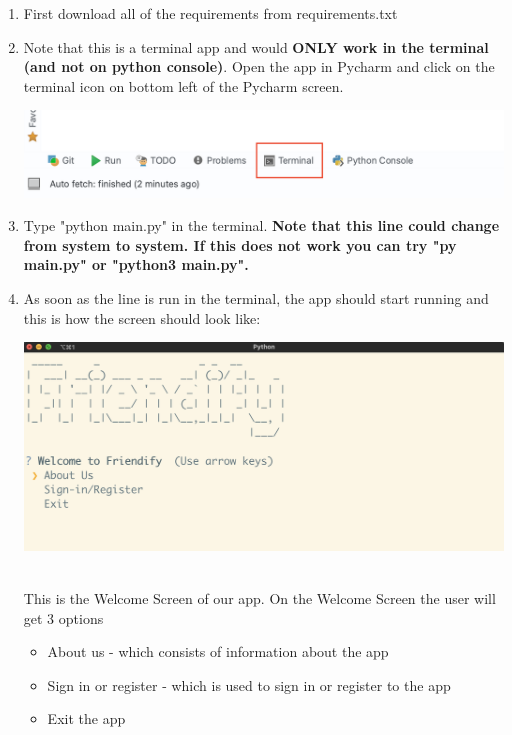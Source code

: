 \documentclass[11pt]{report}
\begin{document}
\begin{enumerate}
    \item First download all of the requirements from requirements.txt
    
    \item Note that this is a terminal app and would \textbf{ONLY work in the terminal (and not on python console)}. Open the app in Pycharm and click on the terminal icon on bottom left of the Pycharm screen. 
    
    \begin{center}
        \includegraphics[scale = .5]{Images/terminal_icon_2.png}
    \end{center}
    
    \item Type "python main.py" in the terminal. \textbf{Note that this line could change from system to system. If this does not work you can try "py main.py" or "python3 main.py".}
    
    \item As soon as the line is run in the terminal, the app should start running and this is how the screen should look like: 
    
    \begin{center}
        \includegraphics[scale = .35]{Images/home.png}
    \end{center}\\

    This is the Welcome Screen of our app. On the Welcome Screen the user will get 3 options
    
    \begin{itemize}
        \item About us - which consists of information about the app
        \item Sign in or register - which is used to sign in or register to the app
        \item Exit the app
    \end{itemize}
    

\end{enumerate}
\end{document}
